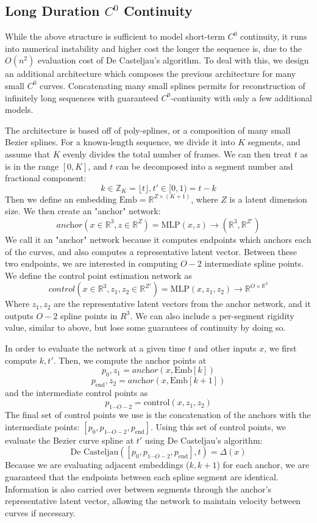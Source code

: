 \subsection*{Long Duration $C^0$ Continuity}

While the above structure is sufficient to model short-term $C^0$ continuity, it runs into
numerical instability and higher cost the longer the sequence is, due to the $O(n^2)$
evaluation cost of De Casteljau's algorithm. To deal with this, we design an additional architecture which
composes the previous architecture for many small $C^0$ curves. Concatenating many small splines permits for reconstruction of infinitely long sequences with guaranteed $C^0$-continuity with only a few additional models.

The architecture is based off of poly-splines, or a composition of many small Bezier splines.
For a known-length sequence, we divide it into $K$ segments, and assume that $K$ evenly divides the total number of frames. We can then treat $t$ as is
in the range $[0, K]$, and $t$ can be decomposed into a segment number and fractional component:
\[ k\in\mathbb{Z}_K=\lfloor t\rfloor, t'\in[0,1)=t-k \]
Then we define an embedding $\text{Emb} = \mathbb{R}^{Z\times(K+1)}$, where $Z$ is a latent
dimension size. We then create an "anchor" network:
\[
    \textit{anchor}(x\in\mathbb{R}^3,z\in\mathbb{R}^Z) = \text{MLP}(x,z)\to(\mathbb{R}^3,\mathbb{R}^{Z'})
\]
We call it an "anchor" network because it computes
endpoints which anchors each of the curves, and also computes a representative latent vector. Between these two
endpoints, we are interested in computing $O-2$ intermediate spline points. We define the
control point estimation network as
\[
\textit{control}(x\in\mathbb{R}^3, z_1, z_2\in\mathbb{R}^{Z'}) = \text{MLP}(x,z_1,z_2)\to\mathbb{R}^{O\times\mathbb{R}^3}
\]
Where $z_1,z_2$ are the
representative latent vectors from the anchor network, and it outputs $O-2$ spline points in
$R^3$. We can also include a per-segment rigidity value, similar to above, but lose
some guarantees of continuity by doing so.

In order to evaluate the network at a given time $t$ and other inputs $x$, we first compute $k, t'$. Then, we compute
the anchor points at
\[ p_0,z_1=\textit{anchor}(x,\text{Emb}[k]) \]
\[ p_\text{end},z_2=\textit{anchor}(x,\text{Emb}[k+1]) \]
and the intermediate control points as \[ p_{1\cdots O-2} = \text{control}(x,z_1,z_2) \]
The final set of control points we use
is the concatenation of the anchors with the intermediate points:
$[p_0, p_{1\cdots O-2}, p_\text{end}]$. Using this set of control points, we evaluate the Bezier
curve spline at $t'$ using De Casteljau's algorithm:
\[ \text{De Casteljau}([p_0, p_{1\cdots O-2}, p_\text{end}], t) = \Delta(x) \]
Because we are evaluating adjacent embeddings ($k, k+1$) for each anchor, we are guaranteed that the endpoints between each spline segment are identical. Information is also carried over between segments through the anchor's
representative latent vector, allowing the network to maintain velocity between curves if necessary.

